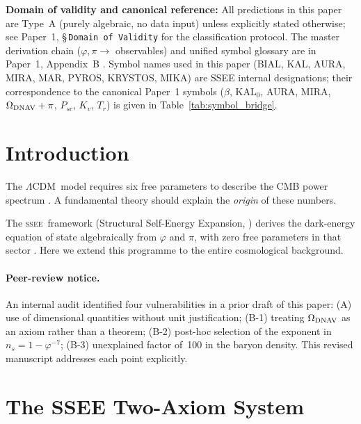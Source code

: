 \documentclass[12pt,a4paper]{article}
\newcommand{\SSEE}{\ifmmode\mathrm{SSEE}\else\textsc{ssee}\fi}
\newcommand{\LCDM}{\ifmmode\Lambda\mathrm{CDM}\else$\Lambda$CDM\fi}
\begin{document}
\noindent\textbf{Domain of validity and canonical reference:}
All predictions in this paper are Type~A (purely algebraic, no data input)
unless explicitly stated otherwise;
see Paper~1, \S\,\texttt{Domain of Validity} for the classification protocol.
The master derivation chain ($\varphi,\pi\to$ observables) and unified symbol
glossary are in Paper~1, Appendix~B \citep{AlmeidaSSEE2026paper1}.
Symbol names used in this paper (BIAL, KAL, AURA, MIRA, MAR, PYROS, KRYSTOS,
MIKA) are SSEE internal designations; their correspondence to the canonical
Paper~1 symbols ($\beta$, $\mathrm{KAL}_0$, AURA, MIRA, $\Omega_{\rm DNAV}+\pi$,
$P_{sc}$, $K_v$, $T_r$) is given in Table~\ref{tab:symbol_bridge}.

\tableofcontents

\section{Introduction}

The \LCDM\ model requires six free parameters to describe the CMB power
spectrum \citep{PlanckCollaboration2020a}.  A fundamental theory should
explain the \emph{origin} of these numbers.

The \SSEE\ framework (Structural Self-Energy Expansion,
\citep{AlmeidaSSEE2026genesis}) derives the dark-energy equation of state
algebraically from $\varphi$ and $\pi$, with zero free parameters in that
sector \citep{AlmeidaSSEE2026paper1,AlmeidaSSEE2026paper2,AlmeidaSSEE2026paper3}.
Here we extend this programme to the entire cosmological background.

\paragraph{Peer-review notice.}
An internal audit identified four vulnerabilities in a prior draft of this paper:
(A) use of dimensional quantities without unit justification;
(B-1) treating $\Omega_{\rm DNAV}$ as an axiom rather than a theorem;
(B-2) post-hoc selection of the exponent in $n_s = 1-\varphi^{-7}$;
(B-3) unexplained factor of~100 in the baryon density.
This revised manuscript addresses each point explicitly.

\section{The SSEE Two-Axiom System}
\label{sec:constants}
\end{document}
